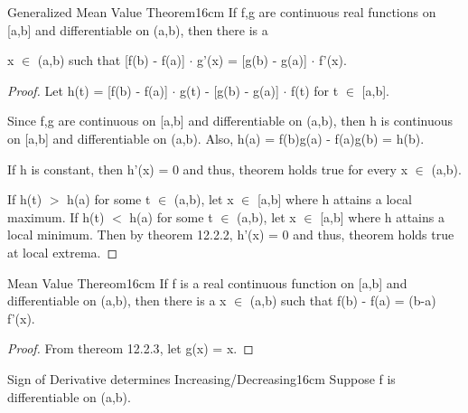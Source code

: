     \vspace{0.5cm}



    \begin{wtheorem}{Generalized Mean Value Theorem}{16cm}
        If f,g are continuous real functions on [a,b] and differentiable on
        (a,b), then there is a
        
        x $\in$ (a,b) such that
        [f(b) - f(a)] $\cdot$ g'(x) = [g(b) - g(a)] $\cdot$ f'(x).        
    \end{wtheorem}

    \begin{proof}
        Let h(t) = [f(b) - f(a)] $\cdot$ g(t) - [g(b) - g(a)] $\cdot$ f(t)
        for t $\in$ [a,b].

        Since f,g are continuous on [a,b] and differentiable on (a,b),
        then h is continuous on [a,b] and differentiable on (a,b).
        Also, h(a) = f(b)g(a) - f(a)g(b) = h(b).

        If h is constant, then h'(x) = 0 and thus, theorem holds true for
        every x $\in$ (a,b).

        If h(t) $>$ h(a) for some t $\in$ (a,b), let x $\in$ [a,b] where
        h attains a local maximum.
        If h(t) $<$ h(a) for some t $\in$ (a,b), let x $\in$ [a,b] where
        h attains a local minimum.
        Then by {\color{red} theorem 12.2.2}, h'(x) = 0 and thus, theorem
        holds true at local extrema.
    \end{proof}

    \newpage



    \begin{wtheorem}{Mean Value Thereom}{16cm}
        If f is a real continuous function on [a,b] and differentiable on (a,b),
        then there is a x $\in$ (a,b) such that f(b) - f(a) = (b-a) f'(x).        
    \end{wtheorem}

    \begin{proof}
        From {\color{red} thereom 12.2.3}, let g(x) = x.
    \end{proof}

    \vspace{0.5cm}



    \begin{wtheorem}{Sign of Derivative determines Increasing/Decreasing}{16cm}
        Suppose f is differentiable on (a,b).
    \end{wtheorem}

